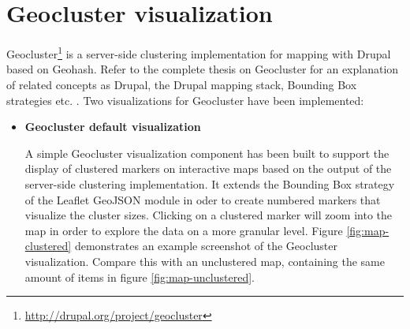 \section{Geocluster visualization}
\label{chapter:geocluster-vis}

Geocluster\footnote{\url{http://drupal.org/project/geocluster}} is a server-side clustering implementation for mapping with Drupal based on Geohash. Refer to the complete thesis on Geocluster for an explanation of related concepts as Drupal, the Drupal mapping stack, Bounding Box strategies etc. \cite{geocluster-thesis}. Two visualizations for Geocluster have been implemented:

\begin{itemize}

\item \textbf{Geocluster default visualization}

A simple Geocluster visualization component has been built to support the display of clustered markers on interactive maps based on the output of the server-side clustering implementation. It extends the Bounding Box strategy of the Leaflet GeoJSON module in oder to create numbered markers that visualize the cluster sizes. Clicking on a clustered marker will zoom into the map in order to explore the data on a more granular level. Figure \ref{fig:map-clustered} demonstrates an example screenshot of the Geocluster visualization. Compare this with an unclustered map, containing the same amount of items in figure \ref{fig:map-unclustered}.



\end{itemize}
